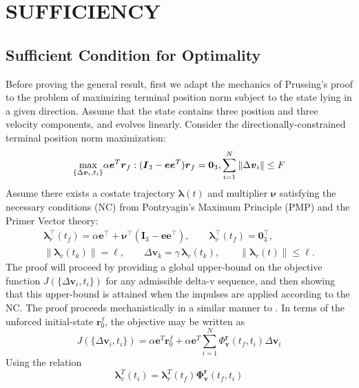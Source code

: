\documentclass[letterpaper, 10 pt, conference]{ieeeconf}  %
\begin{document}
\section{SUFFICIENCY} 

\subsection{Sufficient Condition for Optimality} 
\label{sec:suffiency-a}
Before proving the general result, first we adapt the mechanics of Prussing's proof to the problem of maximizing terminal position norm subject to the state lying in a given direction. 
Assume that the state contains three position and three velocity components, and evolves linearly.  Consider the directionally-constrained terminal position norm maximization: \begin{equation} \underset{ \{  \Delta \boldsymbol{v}_i, t_i  \}}{\text{max}} \alpha \boldsymbol{e}^T\boldsymbol{r}_f : \\ (\boldsymbol{I}_3 - \boldsymbol{e}\boldsymbol{e}^T)\boldsymbol{r}_f = \boldsymbol{0}_3, \sum_{i=1}^N  \| \Delta \boldsymbol{v}_i \| \leq F \label{eqn:controlproblem}\end{equation} Assume there exists a costate trajectory \(\boldsymbol{\lambda}(t)\) and multiplier \(\boldsymbol{\nu}\) satisfying the necessary conditions (NC) from Pontryagin's Maximum Principle (PMP) and the Primer Vector theory:
\begin{equation}
\begin{gathered}
\boldsymbol{\lambda}_r^\top(t_f)
=
\alpha \boldsymbol{e}^\top
+
\boldsymbol{\nu}^\top
\left(\boldsymbol{I}_3-\boldsymbol{e}\boldsymbol{e}^\top\right),
\qquad
\boldsymbol{\lambda}_v^\top(t_f)=\boldsymbol{0}_3^\top,\\
\left\|\boldsymbol{\lambda}_v(t_k)\right\|=\ell,
\qquad
\Delta\boldsymbol{v}_k
=
\gamma\,\boldsymbol{\lambda}_v(t_k),
\qquad
\left\|\boldsymbol{\lambda}_v(t)\right\|\leq\ell.
\end{gathered}
\label{eq:NC}
\end{equation}
The proof will proceed by providing a global upper-bound on the objective function $J(\{ \Delta \boldsymbol{v}_i, t_i \})$ for any admissible delta-v sequence, and then showing that this upper-bound is attained when the impulses are applied according to the NC. The proof proceeds mechanistically in a similar manner to \cite{Prussing1995}. In terms of the unforced initial-state $\boldsymbol{r}_0^f$, the objective may be written as \[
J(\{\Delta \boldsymbol{v}_i, t_i\}) = \alpha \boldsymbol{e}^T\boldsymbol{r}_0^f + \alpha \boldsymbol{e}^T\sum_{i=1}^N \Phi_{\boldsymbol{v}}^{\boldsymbol{r}}(t_f, t_i) \Delta \boldsymbol{v}_i
\] Using the relation \[\boldsymbol{\lambda}_v^T(t_i) = \boldsymbol{\lambda}_r^T(t_f) \boldsymbol{\Phi_v^r}(t_f, t_i)\]
\end{document}
